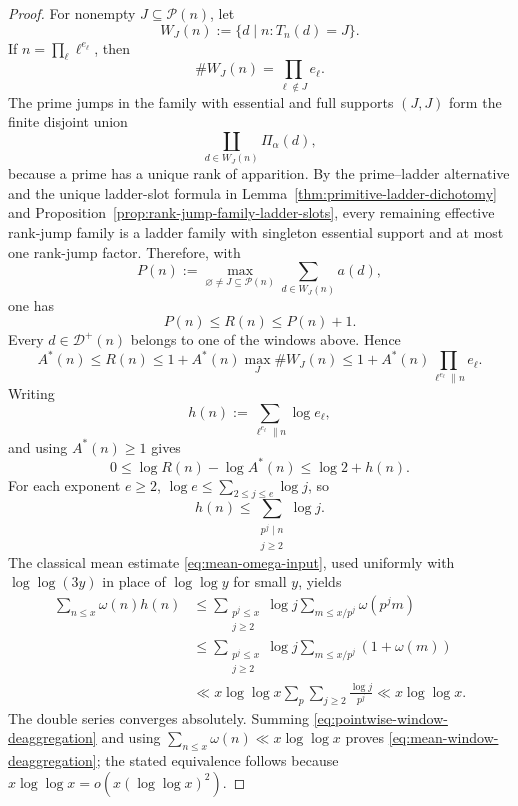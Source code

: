 \begin{proof}
For nonempty $J\subseteq\mathcal P(n)$, let
\[
 W_J(n):=\{d\mid n:T_n(d)=J\}.
\]
If $n=\prod_\ell\ell^{e_\ell}$, then
\begin{equation}\label{eq:support-window-size}
 \#W_J(n)=\prod_{\ell\notin J}e_\ell.
\end{equation}
The prime jumps in the family with essential and full supports $(J,J)$ form
the finite disjoint union
\[
 \coprod_{d\in W_J(n)}\Pi_\alpha(d),
\]
because a prime has a unique rank of apparition. By the prime--ladder
alternative and the unique ladder-slot formula in
Lemma~\ref{thm:primitive-ladder-dichotomy} and
Proposition~\ref{prop:rank-jump-family-ladder-slots}, every remaining effective
rank-jump family is a ladder family with singleton essential support and at most
one rank-jump factor. Therefore, with
\[
 P(n):=\max_{\varnothing\ne J\subseteq\mathcal P(n)}
       \sum_{d\in W_J(n)}a(d),
\]
one has
\begin{equation}\label{eq:prime-window-versus-R}
 P(n)\le R(n)\le P(n)+1.
\end{equation}
Every $d\in\mathcal D^+(n)$ belongs to one of the windows above. Hence
\[
 A^*(n)\le R(n)
 \le1+A^*(n)\max_J\#W_J(n)
 \le1+A^*(n)\prod_{\ell^{e_\ell}\parallel n}e_\ell.
\]
Writing
\[
 h(n):=\sum_{\ell^{e_\ell}\parallel n}\log e_\ell,
\]
and using $A^*(n)\ge1$ gives
\begin{equation}\label{eq:pointwise-window-deaggregation}
 0\le\log R(n)-\log A^*(n)\le\log2+h(n).
\end{equation}
For each exponent $e\ge2$, $\log e\le\sum_{2\le j\le e}\log j$, so
\[
 h(n)\le\sum_{\substack{p^j\mid n\\j\ge2}}\log j.
\]
The classical mean estimate \eqref{eq:mean-omega-input}, used uniformly with
$\log\log(3y)$ in place of $\log\log y$ for small $y$, yields
\begin{align*}
 \sum_{n\le x}\omega(n)h(n)
 &\le\sum_{\substack{p^j\le x\\j\ge2}}\log j
       \sum_{m\le x/p^j}\omega(p^jm)\\
 &\le\sum_{\substack{p^j\le x\\j\ge2}}\log j
       \sum_{m\le x/p^j}(1+\omega(m))\\
 &\ll x\log\log x\sum_p\sum_{j\ge2}\frac{\log j}{p^j}
 \ll x\log\log x.
\end{align*}
The double series converges absolutely. Summing
\eqref{eq:pointwise-window-deaggregation} and using
$\sum_{n\le x}\omega(n)\ll x\log\log x$ proves
\eqref{eq:mean-window-deaggregation}; the stated equivalence follows because
$x\log\log x=o(x(\log\log x)^2)$.
\end{proof}

